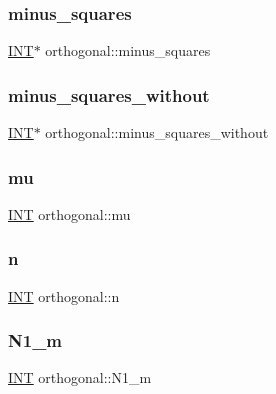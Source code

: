 \subsubsection{\texorpdfstring{minus\+\_\+squares}{minus\_squares}}
{\footnotesize\ttfamily \mbox{\hyperlink{galois_8h_a09fddde158a3a20bd2dcadb609de11dc}{I\+NT}}$\ast$ orthogonal\+::minus\+\_\+squares}

\mbox{\label{classorthogonal_a35e0a33a2f39989d5b6f89b7bdaa1fff}} 
\subsubsection{\texorpdfstring{minus\+\_\+squares\+\_\+without}{minus\_squares\_without}}
{\footnotesize\ttfamily \mbox{\hyperlink{galois_8h_a09fddde158a3a20bd2dcadb609de11dc}{I\+NT}}$\ast$ orthogonal\+::minus\+\_\+squares\+\_\+without}

\mbox{\label{classorthogonal_a074334df90f035930c7190f79bed794f}} 
\subsubsection{\texorpdfstring{mu}{mu}}
{\footnotesize\ttfamily \mbox{\hyperlink{galois_8h_a09fddde158a3a20bd2dcadb609de11dc}{I\+NT}} orthogonal\+::mu}

\mbox{\label{classorthogonal_a2cd5494a7d4c21cb8b64262bf1638792}} 
\subsubsection{\texorpdfstring{n}{n}}
{\footnotesize\ttfamily \mbox{\hyperlink{galois_8h_a09fddde158a3a20bd2dcadb609de11dc}{I\+NT}} orthogonal\+::n}

\mbox{\label{classorthogonal_a36877480cb91631c9c7dd70c37086057}} 
\subsubsection{\texorpdfstring{N1\+\_\+m}{N1\_m}}
{\footnotesize\ttfamily \mbox{\hyperlink{galois_8h_a09fddde158a3a20bd2dcadb609de11dc}{I\+NT}} orthogonal\+::\+N1\+\_\+m}

